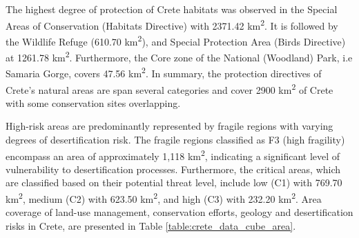 The highest degree of protection of Crete habitats was observed in the Special Areas
of Conservation (Habitats Directive) with 2371.42 km\textsuperscript{2}.
It is followed by the Wildlife Refuge (610.70 km\textsuperscript{2}),
and Special Protection Area (Birds Directive) at 1261.78 km\textsuperscript{2}.
Furthermore, the Core zone of the National (Woodland) Park, i.e Samaria Gorge, covers 47.56 km\textsuperscript{2}.
In summary, the protection directives of Crete's natural areas are span several categories and cover 2900 km\textsuperscript{2}
of Crete with some conservation sites overlapping.

High-risk areas are predominantly represented by fragile regions with varying
degrees of desertification risk. The fragile regions classified as F3 (high fragility)
encompass an area of approximately 1,118 km\textsuperscript{2},
indicating a significant level of vulnerability to desertification processes.
Furthermore, the critical areas, which are classified based on their potential
threat level, include low (C1) with 769.70 km\textsuperscript{2}, medium (C2)
with 623.50 km\textsuperscript{2}, and high (C3) with 232.20 km\textsuperscript{2}.
Area coverage of land-use management, conservation efforts, geology and
desertification risks in Crete, are presented in Table \ref{table:crete_data_cube_area}.

